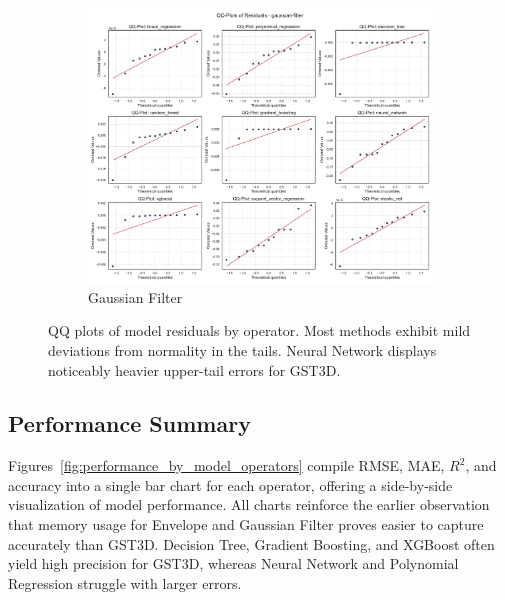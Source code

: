 \begin{figure}[htbp]
\begin{subfigure}[t]{0.32\textwidth}
        \includegraphics[width=\textwidth]{assets/images/05/residual_qq_plots_gaussian-filter}
        \caption{Gaussian Filter}
    \end{subfigure}
    \caption{\ac{QQ} plots of model residuals by operator.
        Most methods exhibit mild deviations from normality in the tails.
        Neural Network displays noticeably heavier upper-tail errors for \ac{GST3D}.
        \label{fig:residual_qq_plots}
    }
\end{figure}

\subsection{Performance Summary}
\label{subsec:performance-summary}

Figures~\ref{fig:performance_by_model_operators} compile \ac{RMSE}, \ac{MAE}, $R^2$, and accuracy into a single bar chart for each operator, offering a side-by-side visualization of model performance.
All charts reinforce the earlier observation that memory usage for Envelope and Gaussian Filter proves easier to capture accurately than \ac{GST3D}.
Decision Tree, Gradient Boosting, and XGBoost often yield high precision for \ac{GST3D}, whereas Neural Network and Polynomial Regression struggle with larger errors.

